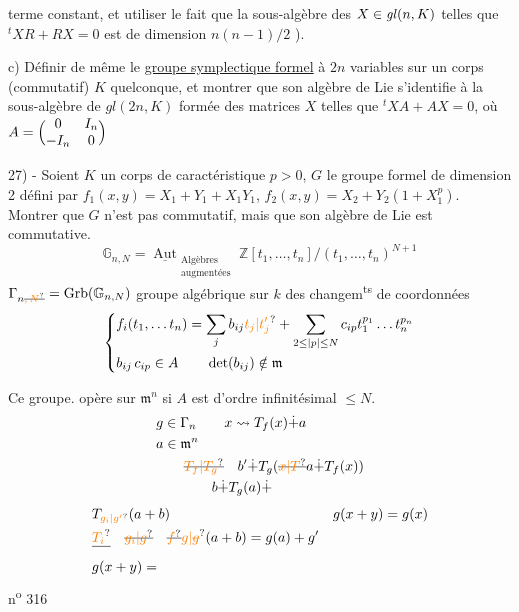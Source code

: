 terme constant, et utiliser le fait que la sous-algèbre des $X\in\mathit{gl}(n,K)$ telles que $ {}^{t}XR+RX=0$ est de dimension $n(n-1)/2$ ).

c) Définir de même le \uline{groupe symplectique formel} à $2n$ variables sur un corps (commutatif) $K$ quelconque, et montrer que son algèbre de Lie s'identifie à la sous-algèbre de $\mathit{gl}(2n,K)$ formée des matrices $X$ telles que $ {}^{t}XA+AX=0$, où $A=\Bigl(\begin{matrix}0&I_n\\-I_n&0\end{matrix}\Bigr)$

27) - Soient $K$ un corps de caractéristique $p>0$, $G$ le groupe formel de dimension 2 défini par $f_1(x,y)=X_1+Y_1+X_1Y_1$, $f_2(x,y)=X_2+Y_2(1+X_1^p)$. Montrer que $G$ n'est pas commutatif, mais que son algèbre de Lie est commutative.
\[
\mathbb G_{n,N}=\underline{\operatorname{Aut}}_{\substack{\text{Algèbres}\\\text{augmentées}}}
\mathbb Z[t_1,\ldots,t_n]/(t_1,\ldots,t_n)^{N+1}
\]
$\Gamma_{n\deleted{\unsure{,N}}}=\operatorname{Grb}(\mathbb G_{n,N})$ groupe algébrique sur $k$ des changem\textsuperscript{ts} de coordonnées
\[
\left\{\begin{aligned}
&f_i(t_1,\ldots t_n)=\sum_j b_{ij}\unsure{t_j|t'_j}+
\sum_{2\leq|p|\leq N}c_{ip}t_1^{p_1}\ldots t_n^{p_n}\\
&b_{ij}\,c_{ip}\in A\qquad\det(b_{ij})\notin\mathfrak m
\end{aligned}\right.
\]

Ce groupe. opère sur $\mathfrak m^n$ si $A$ est d'ordre infinitésimal $\leq N$. 
\[
\begin{aligned}
&g\in\Gamma_n \qquad x\leadsto T_f(x)\dot{+}a\\
&a\in\mathfrak m^n\\
&\qquad\deleted{\unsure{T_f|T_g}}\quad b'\dot{+}T_g(\deleted{\unsure{x|T}}a\dot{+}T_f(x))\\
&\qquad\qquad b\dot{+}T_g(a)\dot{+}
\end{aligned}
\]
\[
\begin{aligned}
&T_{\unsure{g_i|g'}}(a+b) &&g(x+y)=g(x)\\
&\deleted{\unsure{T_i}}\quad\deleted{\unsure{g_i|g}}\quad
\deleted{\unsure{f}}{\unsure{g|\deleted{g}}}(a+b)=g(a)+g'\\
&g(x+y)=
\end{aligned}
\]
\hfill n\textsuperscript{o} 316


